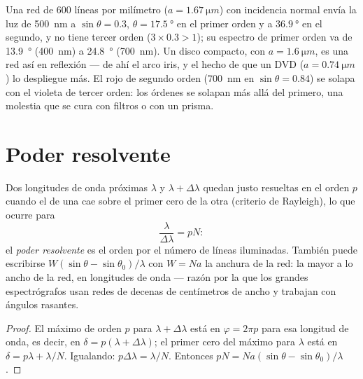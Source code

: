 \begin{example}\label{ex:b2:gratings:examples}
Una red de $600$ líneas por milímetro ($a = \qty{1.67}{\micro m}$) con incidencia
normal envía la luz de \qty{500}{nm} a $\sin\theta = 0.3$, $\theta = \qty{17.5}{\degree}$ en
el primer orden y a $\qty{36.9}{\degree}$ en el segundo, y no tiene tercer orden
($3 \times 0.3 > 1$); su espectro de primer orden va de \qty{13.9}{\degree}
(\qty{400}{nm}) a \qty{24.8}{\degree} (\qty{700}{nm}). Un disco compacto, con $a =
\qty{1.6}{\micro m}$, es una red así en reflexión --- de ahí el arco iris,
y el hecho de que un DVD ($a = \qty{0.74}{\micro m}$) lo despliegue más. El
rojo de segundo orden (\qty{700}{nm} en $\sin\theta = 0.84$) se solapa con el violeta de
tercer orden: los órdenes se solapan más allá del primero, una molestia que se cura con filtros
o con un prisma.
\end{example}

\section{Poder resolvente}

\begin{proposition}\label{prop:b2:gratings:resolution}
Dos longitudes de onda próximas $\lambda$ y $\lambda + \Delta\lambda$ quedan justo resueltas en el orden $p$
cuando el  de una cae sobre el primer cero de la otra
(criterio de Rayleigh), lo que ocurre para
\[
\frac\lambda{\Delta\lambda} = pN :
\]
el \emph{poder resolvente} es el orden por el número de líneas
iluminadas. También puede escribirse $W(\sin\theta - \sin\theta_0)/\lambda$ con $W = Na$ la
anchura de la red: la mayor  a lo ancho de la red,
en longitudes de onda --- razón por la que los grandes espectrógrafos usan redes de decenas de
centímetros de ancho y trabajan con ángulos rasantes.
\end{proposition}

\begin{proof}
El máximo de orden $p$ para $\lambda + \Delta\lambda$ está en $\varphi = 2\pi p$ para esa
longitud de onda, es decir, en $\delta = p(\lambda + \Delta\lambda)$; el primer cero del máximo
para $\lambda$ está en $\delta = p\lambda + \lambda/N$. Igualando: $p\Delta\lambda = \lambda/N$. Entonces $pN =
Na(\sin\theta - \sin\theta_0)/\lambda$.
\end{proof}

